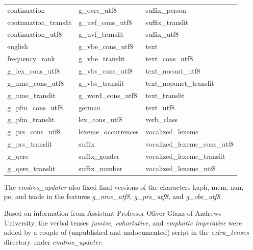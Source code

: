 \documentclass[11pt,oneside,a4paper]{memoir}
\begin{document}
\begin{center}
  \begin{tabular}{lll}
    continuation           & g\_qere\_utf8       &  suffix\_person                \\
    continuation\_translit & g\_uvf\_cons\_utf8  &  suffix\_translit              \\
    continuation\_utf8     & g\_uvf\_translit    &  suffix\_utf8                  \\
    english                & g\_vbe\_cons\_utf8  &  text                          \\
    frequency\_rank        & g\_vbe\_translit    &  text\_cons\_utf8              \\
    g\_lex\_cons\_utf8     & g\_vbs\_cons\_utf8  &  text\_nocant\_utf8            \\
    g\_nme\_cons\_utf8     & g\_vbs\_translit    &  text\_nopunct\_translit       \\
    g\_nme\_translit       & g\_word\_cons\_utf8 &  text\_translit                \\
    g\_pfm\_cons\_utf8     & german              &  text\_utf8                    \\
    g\_pfm\_translit       & lex\_cons\_utf8     &  verb\_class                   \\
    g\_prs\_cons\_utf8     & lexeme\_occurrences &  vocalized\_lexeme             \\
    g\_prs\_translit       & suffix              &  vocalized\_lexeme\_cons\_utf8 \\
    g\_qere                & suffix\_gender      &  vocalized\_lexeme\_translit   \\
    g\_qere\_translit      & suffix\_number      &  vocalized\_lexeme\_utf8       \\
  \end{tabular}
\end{center}

The \emph{emdros\_updater} also fixed final versions of the characters kaph, mem, nun, pe, and tsade
in the features \emph{g\_nme\_utf8,} \emph{g\_prs\_utf8,} and \emph{g\_vbe\_utf8}.

Based on information from Assistant Professor Oliver Glanz of Andrews University, the verbal tenses
\emph{jussive, cohortative,} and \emph{emphatic imperative} were added by a couple of (unpublished
and undocumented) script in the \emph{extra\_tenses} directory under \emph{emdros\_updater.}

\end{document}
